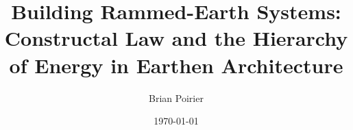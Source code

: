 \documentclass{article}
\begin{document}
\title{Building Rammed-Earth Systems: Constructal Law and the Hierarchy of Energy in Earthen Architecture}
\author{Brian Poirier}
\date{\today}
\maketitle
\clearpage



% 


\clearpage

\printbibliography
\end{document}
